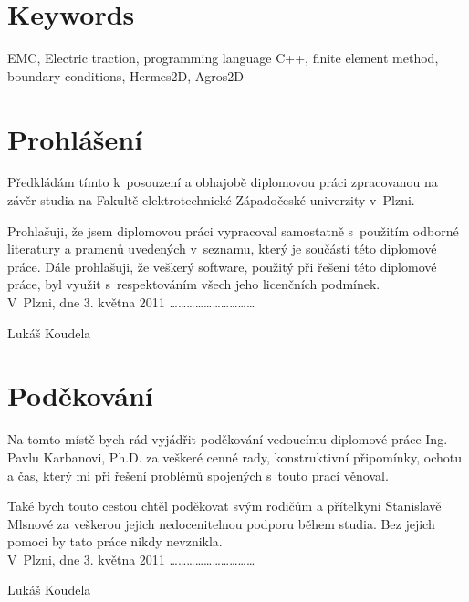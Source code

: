 \section*{Keywords}
EMC, Electric traction, programming language C++, finite element method, boundary conditions, Hermes2D, Agros2D
\newpage

\section*{Prohlášení}
Předkládám tímto k~posouzení a obhajobě diplomovou práci zpracovanou na závěr studia na Fakultě elektrotechnické Západočeské univerzity v~Plzni.

Prohlašuji, že jsem diplomovou práci vypracoval samostatně s~použitím odborné literatury a pramenů uvedených v~seznamu, který je součástí této diplomové práce.
Dále prohlašuji, že veškerý software, použitý při řešení této diplomové práce, byl využit s~respektováním všech jeho licenčních podmínek.\bigskip \bigskip \\

\noindent V~Plzni, dne 3. května 2011 \hfill \ldots \ldots \ldots \ldots \ldots \ldots \ldots \ldots \ldots \ldots
\noindent \begin{flushright}Lukáš Koudela ~~~~~~~\end{flushright}
\newpage

\section*{Poděkování}
Na tomto místě bych rád vyjádřit poděkování vedoucímu diplomové práce Ing. Pavlu Karbanovi, Ph.D. za veškeré cenné rady, konstruktivní připomínky, ochotu a čas, který mi při řešení problémů spojených s~touto prací věnoval.

Také bych touto cestou chtěl poděkovat svým rodičům a přítelkyni Stanislavě Mlsnové za veškerou jejich nedocenitelnou podporu během studia. Bez jejich pomoci by tato práce nikdy nevznikla.\bigskip \bigskip \\

\noindent V~Plzni, dne 3. května 2011 \hfill \ldots \ldots \ldots \ldots \ldots \ldots \ldots \ldots \ldots \ldots
\noindent \begin{flushright}Lukáš Koudela ~~~~~~~\end{flushright}
\newpage